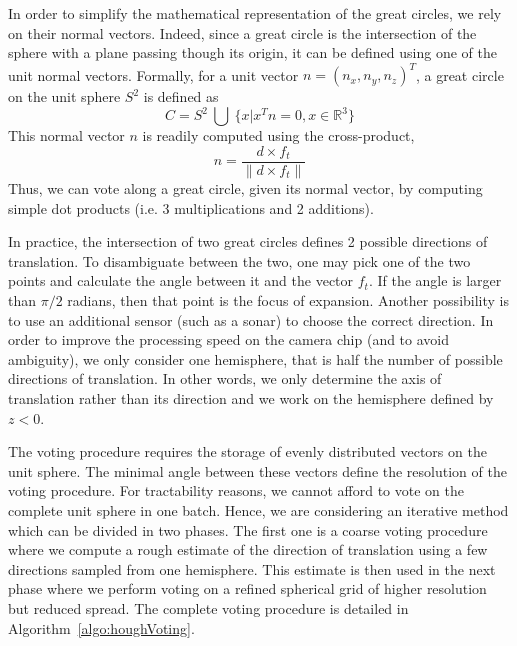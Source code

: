 In order to simplify the mathematical representation of the great circles, we rely on their normal vectors. Indeed, since a great circle is the intersection of the sphere with a plane passing though its origin, it can be defined using one of the unit normal vectors.
Formally, for a unit vector $n = (n_x, n_y, n_z)^T$, a great circle on the unit sphere $S^2$ is defined as
\begin{equation}
C = S^2~\bigcup~\{ x|x^Tn = 0, x \in \mathbb{R}^3 \}
\end{equation}
This normal vector $n$ is readily computed using the cross-product,
\begin{equation}
n = \dfrac{d \times f_t}{\|d \times f_t\|}
\end{equation}
Thus, we can vote along a great circle, given its normal vector, by computing simple dot products (i.e. 3 multiplications and 2 additions).

In practice, the intersection of two great circles defines 2 possible directions of translation. To disambiguate between the two, one may pick one of the two points and calculate the angle between it and the vector $f_t$. If the angle is larger than $\pi/2$ radians, then that point is the focus of expansion. Another possibility is to use an additional sensor (such as a sonar) to choose the correct direction. In order to improve the processing speed on the camera chip (and to avoid ambiguity), we only consider one hemisphere, that is half the number of possible directions of translation. In other words, we only determine the axis of translation rather than its direction and we work on the hemisphere defined by $z<0$.

The voting procedure requires the storage of evenly distributed vectors on the unit sphere. The minimal angle between these vectors define the resolution of the voting procedure. For tractability reasons, we cannot afford to vote on the complete unit sphere in one batch. Hence, we are considering an iterative method which can be divided in two phases. The first one is a coarse voting procedure where we compute a rough estimate of the direction of translation using a few directions sampled from one hemisphere. This estimate is then used in the next phase where we perform voting on a refined spherical grid of higher resolution but reduced spread. The complete voting procedure is detailed in Algorithm~\ref{algo:houghVoting}.

